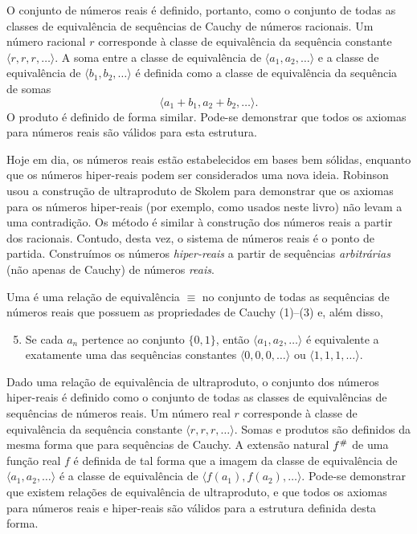 O conjunto de números reais é definido, portanto, como o conjunto de todas
as classes de equivalência de sequências de Cauchy de números racionais. Um
número racional $r$ corresponde à classe de equivalência da sequência
constante $\langle r, r, r, \ldots \rangle$. A soma entre a classe de
equivalência de $\langle a_1, a_2, \ldots \rangle$ e a classe de
equivalência de $\langle b_1, b_2, \ldots \rangle$ é definida como a classe
de equivalência da sequência de somas
$$
  \langle a_1+b_1 , a_2+b_2, \ldots \rangle.
$$
O produto é definido de forma similar. Pode-se demonstrar que todos os
axiomas para números reais são válidos para esta estrutura.

Hoje em dia, os números reais estão estabelecidos em bases bem sólidas,
enquanto que os números hiper-reais podem ser considerados uma nova
ideia. Robinson usou a construção de ultraproduto
de Skolem para demonstrar
que os axiomas para os números hiper-reais (por exemplo, como usados neste
livro) não levam a uma contradição. Os método é similar à construção dos
números reais a partir dos racionais. Contudo, desta vez, o sistema de
números reais é o ponto de partida. Construímos os números \emph{hiper-reais}
a partir de sequências \emph{arbitrárias} (não apenas de Cauchy) de números
\emph{reais}.

Uma 
é uma relação de equivalência $\equiv$ no conjunto de todas as sequências
de números reais que possuem as propriedades de Cauchy (1)--(3) e, além disso,
\begin{enumerate}[(1)]
\setcounter{enumi}{4}
\item Se cada $a_n$ pertence ao conjunto $\{0,1\}$, então
      $\langle a_1, a_2, \ldots \rangle$ é equivalente a exatamente uma das
      sequências constantes $\langle 0,0,0, \ldots \rangle$ ou
      $\langle 1,1,1,\ldots \rangle$.
\end{enumerate}

Dado uma relação de equivalência de ultraproduto, o conjunto dos números
hiper-reais é definido como o conjunto de todas as classes de equivalências
de sequências de números reais. Um número real $r$ corresponde à classe de
equivalência da sequência constante $\langle r,r,r,\ldots \rangle$. Somas
e produtos são definidos da mesma forma que para sequências de Cauchy.
A extensão natural ${f}^\#$ de uma função real $f$ é definida de tal forma
que a imagem da classe de equivalência de $\langle a_1,a_2,\ldots \rangle$ é
a classe de equivalência de $\langle f(a_1),f(a_2),\ldots \rangle$. Pode-se
demonstrar que existem relações de equivalência de ultraproduto, e que todos
os axiomas para números reais e hiper-reais são válidos para a estrutura
definida desta forma.

